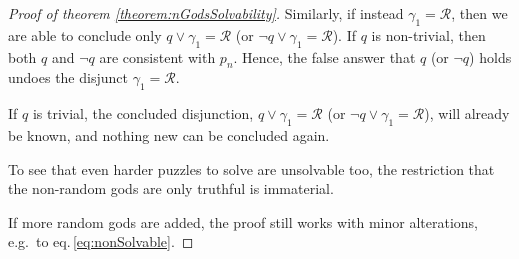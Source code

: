 \documentclass[10pt,a4paper]{amsart}
\begin{document}
\begin{proof}[Proof of theorem \ref{theorem:nGodsSolvability}]
Similarly, if instead $\gamma_1=\mathcal{R}$, then we are able to conclude only
$q \vee \gamma_1\!=\!\mathcal{R}$ (or $\neg q \vee \gamma_1\!=\!\mathcal{R}$).
If $q$ is non-trivial, 
then both $q$ and $\neg q$ are consistent with $p_n$.
Hence, the false answer that $q$ (or $\neg q$) holds
undoes the disjunct $\gamma_1=\mathcal{R}$. 

If $q$ is trivial, the concluded disjunction, 
$q \vee \gamma_1\!=\!\mathcal{R}$ (or $\neg q \vee \gamma_1\!=\!\mathcal{R}$),
will already be known, and nothing new can be concluded again.


To see that even harder puzzles to solve are unsolvable too,
the restriction that the non-random gods are only truthful is immaterial.

If more random gods are added, the proof still works with minor alterations, e.g.\
to eq.\,\eqref{eq:nonSolvable}. 
\end{proof}
\end{document}
